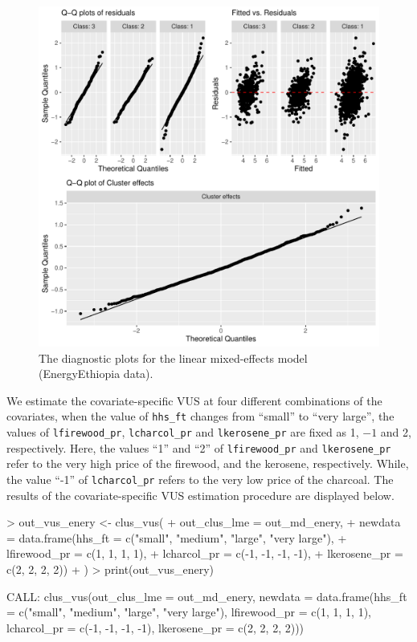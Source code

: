 {\begin{figure}[htbp]
\centering
\includegraphics[width=0.7\linewidth]{diagnosis_model_energy.pdf} 
\caption{The diagnostic plots for the linear mixed-effects model (EnergyEthiopia data).}
\label{fig:diag-md-energy}
\end{figure}

We estimate the covariate-specific VUS at four different combinations of the covariates, when the value of \texttt{hhs\_ft} changes from ``small'' to ``very large'', the values of \texttt{lfirewood\_pr}, \texttt{lcharcol\_pr} and \texttt{lkerosene\_pr} are fixed as 1, $-1$ and 2, respectively. Here, the values ``1'' and ``2'' of \texttt{lfirewood\_pr} and \texttt{lkerosene\_pr} refer to the very high price of the firewood, and the kerosene, respectively. While, the value ``-1'' of \texttt{lcharcol\_pr} refers to the very low price of the charcoal. The results of the covariate-specific VUS estimation procedure are displayed below.
\begin{example}
> out_vus_enery <- clus_vus(
+   out_clus_lme = out_md_enery,
+   newdata = data.frame(hhs_ft = c("small", "medium", "large", "very large"), 
+                        lfirewood_pr = c(1, 1, 1, 1), 
+                        lcharcol_pr = c(-1, -1, -1, -1), 
+                        lkerosene_pr = c(2, 2, 2, 2))
+ )
> print(out_vus_enery)

CALL: clus_vus(out_clus_lme = out_md_enery, newdata = data.frame(hhs_ft = c("small", 
    "medium", "large", "very large"), lfirewood_pr = c(1, 1, 
    1, 1), lcharcol_pr = c(-1, -1, -1, -1), lkerosene_pr = c(2, 
    2, 2, 2)))
 

\end{example}}
